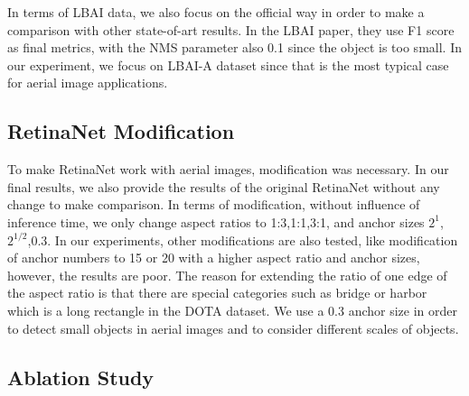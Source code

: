 \documentclass[conference]{IEEEtran}
\begin{document}
    In terms of LBAI data, we also focus on the official way in order to make a comparison with other state-of-art results. In the LBAI paper, they use F1 score as final metrics, with the NMS parameter also 0.1 since the object is too small. In our experiment, we focus on LBAI-A dataset since that is the most typical case for aerial image applications. 

    \subsection{RetinaNet Modification}	
    To make RetinaNet work with aerial images, modification was necessary. In our final results, we also provide the results of the original RetinaNet without any change to make comparison. In terms of modification, without influence of inference time, we only change aspect ratios to {1:3,1:1,3:1}, and anchor sizes {\(2^{1}\),\(2^{1/2}\),\(0.3\)}. In our experiments, other modifications are also tested, like modification of anchor numbers to 15 or 20 with a higher aspect ratio and anchor sizes, however, the results are poor. The reason for extending the ratio of one edge of the aspect ratio is that there are special categories such as bridge or harbor which is a long rectangle in the DOTA dataset. We use a 0.3 anchor size in order to detect small objects in aerial images and to consider different scales of objects.
    
    \subsection{Ablation Study}
\end{document}
